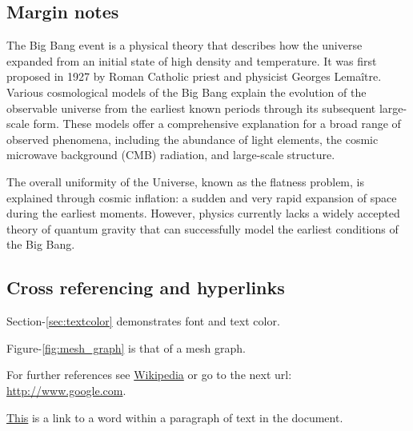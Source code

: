 \subsection{Margin notes}

The Big Bang event is a physical theory that describes how the universe 
expanded from an initial state of high density and temperature. It was 
first proposed in 1927 by Roman Catholic priest and physicist Georges Lemaître. 
Various  cosmological models of the Big Bang 
explain the evolution of the observable universe from the earliest known 
periods through its subsequent large-scale form. These models offer a 
comprehensive explanation for a broad range of observed phenomena, including 
the abundance of light elements, the cosmic microwave background (CMB) 
radiation, and large-scale structure. 

\par

The overall uniformity of the Universe, known as the flatness problem, is 
explained through cosmic inflation: a sudden and very rapid expansion of space 
during the earliest moments. However, physics currently lacks a widely accepted 
theory of quantum gravity that can successfully model the earliest conditions 
of the Big Bang.

\subsection{Cross referencing and hyperlinks}

Section-\ref{sec:textcolor} demonstrates font and text color.
\par
Figure-\ref{fig:mesh_graph} is that of a mesh graph.
\par
For further references see \href{http://www.wikipedia.com}{Wikipedia} 
or go to the next url: \url{http://www.google.com}.
\par
\hyperlink{word:w1}{This} is a link to a word within a paragraph of text in the document.
